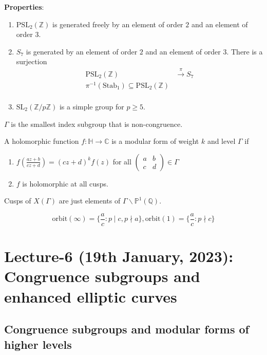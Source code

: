 \documentclass[oneside, 12pt, ]{scrbook}
\newcommand{\CC}{\mathbb C}
\newcommand{\QQ}{\mathbb Q}
\newcommand{\ZZ}{\mathbb Z}
\newcommand{\PP}{\mathbb{P}}
\newcommand{\SL}{\mathrm{SL}}
\theoremstyle{theorem}
\begin{document}
\textbf{Properties}:
\begin{enumerate}
\item $\mathrm{PSL}_{2}(\ZZ)$ is generated freely by an element of order $2$ and an element of order $3$.
\item $S_{7}$ is generated by an element of order $2$ and an element of order $3$. There is a surjection 
\begin{align*}
\mathrm{PSL}_{2}(\ZZ) &\xrightarrow{\pi} S_{7} \\
\pi^{-1}(\mathrm{Stab}_{1}) \subseteq \mathrm{PSL}_{2}(\ZZ) \\
\end{align*}
\item $\SL_{2}(\ZZ/p\ZZ)$ is a simple group for $p \geq 5$.
\end{enumerate}

\begin{remark}
$\Gamma$ is the smallest index subgroup that is non-congruence.
\end{remark}

\begin{definition}
A holomorphic function $f: \mathbb{H} \rightarrow \CC$ is a modular form of weight $k$ and level $\Gamma$ if 
\begin{enumerate}
\item $f\left(\frac{az+b}{cz+d}\right) = (cz+d)^k f(z)$ for all $\begin{pmatrix}
a & b \\ c & d
\end{pmatrix} \in \Gamma$
\item $f$ is holomorphic at all cusps.
\end{enumerate}
Cusps of $X(\Gamma)$ are just elements of $\Gamma \backslash \PP^1 (\QQ)$.
\end{definition}

\begin{proposition}
$$\mathrm{orbit}(\infty) = \{ \frac{a}{c}: p\mid c , p \nmid a\}, \mathrm{orbit}(1) = \{ \frac{a}{c}:p \nmid c\}$$
\end{proposition}

\chapter{Lecture-6 (19th January, 2023): Congruence subgroups and enhanced elliptic curves}

\section{Congruence subgroups and modular forms of higher levels}
\end{document}
